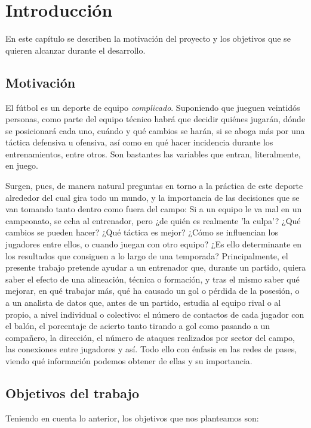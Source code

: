 \chapter{Introducción}
En este capítulo se describen la motivación del proyecto y los objetivos que
se quieren alcanzar durante el desarrollo. 

\section{Motivación}
El fútbol es un deporte de equipo  \textit{complicado}. Suponiendo que 
jueguen veintidós personas, como parte del equipo técnico habrá que 
decidir quiénes jugarán, dónde se posicionará cada uno, cuándo y qué 
cambios se harán, si se aboga más por una táctica defensiva u ofensiva, 
así como en qué hacer incidencia durante los entrenamientos, entre otros. 
Son bastantes las variables que entran, literalmente, en juego. 

Surgen, pues, de manera natural preguntas en torno a la práctica de 
este deporte alrededor del cual gira todo un mundo, y la importancia 
de las decisiones que se van tomando tanto dentro como fuera del 
campo: Si a un equipo le va mal en un campeonato, se echa al entrenador, pero ¿de quién 
es realmente 'la culpa'?\cite{cambio-entrenador} ¿Qué cambios se pueden hacer? ¿Qué táctica es mejor? ¿Cómo se influencian los 
jugadores entre ellos, o cuando juegan con otro equipo? ¿Es ello determinante en los 
resultados que consiguen a lo largo de una temporada? 
Principalmente,  el presente trabajo pretende ayudar a un 
entrenador que, durante un partido, quiera saber el efecto de una 
alineación, técnica o formación, y tras el mismo saber 
qué mejorar, en qué trabajar más, qué ha causado un gol o pérdida 
de la posesión, o a un analista de datos que, antes de un partido, 
estudia al equipo rival o al propio, a nivel individual o colectivo: 
el número de contactos de cada jugador con el balón, el porcentaje 
de acierto tanto tirando a gol como pasando a un compañero, la 
dirección, el número de ataques realizados por sector del campo, 
las conexiones entre jugadores y así. Todo ello con énfasis en las 
redes de pases, viendo qué información podemos obtener de ellas y su 
importancia.

\section{Objetivos del trabajo} \label{sect:goals}

Teniendo en cuenta lo anterior, los objetivos que nos planteamos son:

